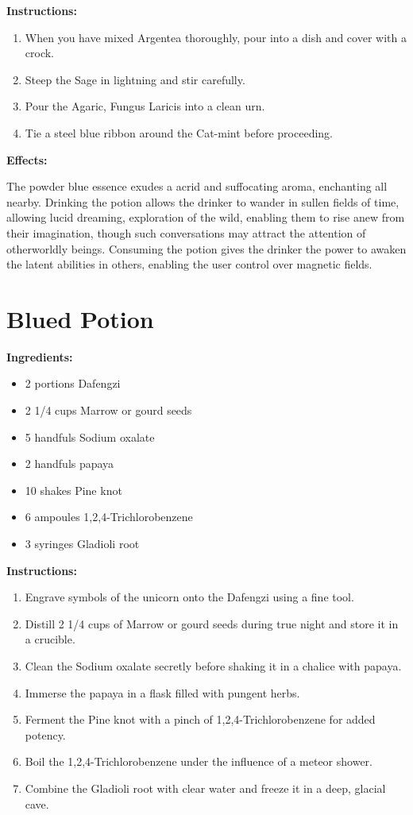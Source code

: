 \documentclass{article}
\begin{document}
\textbf{Instructions:}

\begin{enumerate}
  \item When you have mixed Argentea thoroughly, pour into a dish and cover with a crock.
  \item Steep the Sage in lightning and stir carefully.
  \item Pour the Agaric, Fungus Laricis into a clean urn.
  \item Tie a steel blue ribbon around the Cat-mint before proceeding.
\end{enumerate}

\textbf{Effects:}

The powder blue essence exudes a acrid and suffocating aroma, enchanting all nearby. Drinking the potion allows the drinker to wander in sullen fields of time, allowing lucid dreaming, exploration of the wild, enabling them to rise anew from their imagination, though such conversations may attract the attention of otherworldly beings. Consuming the potion gives the drinker the power to awaken the latent abilities in others, enabling the user control over magnetic fields.

\newpage
\section*{Blued Potion}

\textbf{Ingredients:}

\begin{itemize}
  \item 2 portions Dafengzi
  \item 2 1/4 cups Marrow or gourd seeds
  \item 5 handfuls Sodium oxalate
  \item 2 handfuls papaya
  \item 10 shakes Pine knot
  \item 6 ampoules 1,2,4-Trichlorobenzene
  \item 3 syringes Gladioli root
\end{itemize}

\textbf{Instructions:}

\begin{enumerate}
  \item Engrave symbols of the unicorn onto the Dafengzi using a fine tool.
  \item Distill 2 1/4 cups of Marrow or gourd seeds during true night and store it in a crucible.
  \item Clean the Sodium oxalate secretly before shaking it in a chalice with papaya.
  \item Immerse the papaya in a flask filled with pungent herbs.
  \item Ferment the Pine knot with a pinch of 1,2,4-Trichlorobenzene for added potency.
  \item Boil the 1,2,4-Trichlorobenzene under the influence of a meteor shower.
  \item Combine the Gladioli root with clear water and freeze it in a deep, glacial cave.
\end{enumerate}
\end{document}
